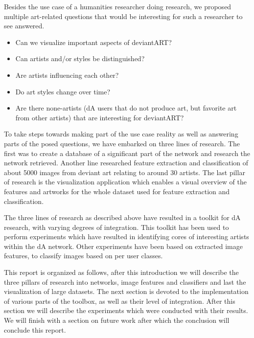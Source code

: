 Besides the use case of a humanities researcher doing research, we proposed multiple art-related questions that would be interesting for such a researcher to see answered.
\begin{itemize}
\item Can we visualize important aspects of deviantART?
\item Can artists and/or styles be distinguished?
\item Are artists influencing each other?
\item Do art styles change over time?
\item Are there none-artists (dA users that do not produce art, but favorite art from other artists) that are interesting for deviantART?
\end{itemize}

To take steps towards making part of the use case reality as well as answering parts of the posed questions, we have embarked on three lines of research. The first was to create a database of a significant part of the network and research the network retrieved. Another line researched feature extraction and classification of about 5000 images from deviant art relating to around 30 artists. The last pillar of research is the visualization application which enables a visual overview of the features and artworks for the whole dataset used for feature extraction and classification.

The three lines of research as described above have resulted in a toolkit for dA research, with varying degrees of integration. This toolkit has been used to perform experiments which have resulted in identifying cores of interesting artists within the dA network. Other experiments have been based on extracted image features, to classify images based on per user classes.

This report is organized as follows, after this introduction we will describe the three pillars of research into networks, image features and classifiers and last the visualization of large datasets. The next section is devoted to the implementation of various parts of the toolbox, as well as their level of integration. After this section we will describe the experiments which were conducted with their results. We will finish with a section on future work after which the conclusion will conclude this report. 
